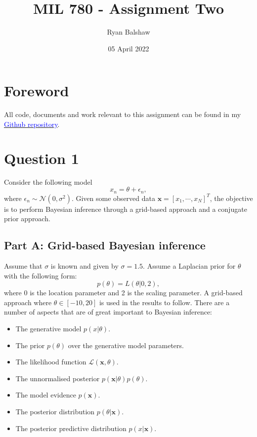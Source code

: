 \documentclass{article}
\title{MIL 780 - Assignment Two}
\author{Ryan Balshaw}
\date{05 April 2022}
\begin{document}
\maketitle

\section*{Foreword}
All code, documents and work relevant to this assignment can be found in my \href{https://github.com/RyanBalshaw/MIL_780_assignments}{\textcolor{blue}{Github repository}}.

\section{Question 1}

Consider the following model
\begin{equation}\label{eq:Q1_model}
x_n = \theta  + \epsilon_n,
\end{equation}
where $\epsilon_n \sim \mathcal{N}(0, \sigma^2)$. Given some observed data $\mathbf{x} = [x_1, \cdots, x_N]^T$, the objective is to perform Bayesian inference through a grid-based approach and a conjugate prior approach.


\subsection{Part A: Grid-based Bayesian inference}

Assume that $\sigma$ is known and given by $\sigma = 1.5$. Assume a Laplacian prior for $\theta$ with the following form:
\begin{equation}
 p(\theta) = L(\theta \vert 0, 2),
\end{equation}    
where 0 is the location parameter and 2 is the scaling parameter. A grid-based approach where $\theta \in [-10, 20]$ is used in the results to follow. There are a number of aspects that are of great important to Bayesian inference:
\begin{itemize}
\item The generative model $p(x \vert \theta)$.
\item The prior $p(\theta)$ over the generative model parameters.
\item The likelihood function $\mathcal{L}(\mathbf{x}, \theta)$.
\item The unnormalised posterior $p(\mathbf{x} \vert \theta)p(\theta)$.
\item The model evidence $p(\mathbf{x})$.
\item The posterior distribution $p(\theta \vert \mathbf{x})$.
\item The posterior predictive distribution $p(x \vert \mathbf{x})$.
\end{itemize}
\end{document}
